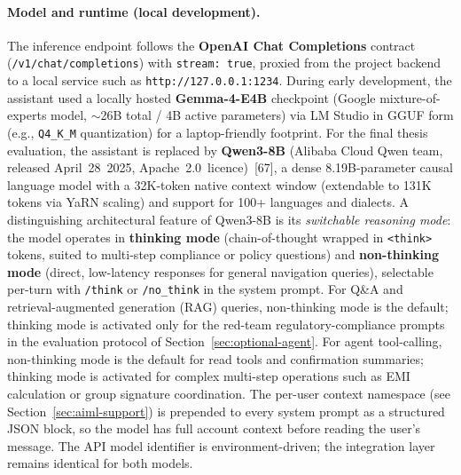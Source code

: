 \documentclass[12pt,a4paper]{report}
\begin{document}
\paragraph{Model and runtime (local development).}
The inference endpoint follows the \textbf{OpenAI Chat Completions} contract (\texttt{/v1/chat/completions}) with \texttt{stream: true}, proxied from the project backend to a local service such as \texttt{http://127.0.0.1:1234}. During early development, the assistant used a locally hosted \textbf{Gemma-4-E4B} checkpoint (Google mixture-of-experts model, $\sim$26B total / 4B active parameters) via LM Studio in GGUF form (e.g., \texttt{Q4\_K\_M} quantization) for a laptop-friendly footprint. For the final thesis evaluation, the assistant is replaced by \textbf{Qwen3-8B} (Alibaba Cloud Qwen team, released April~28~2025, Apache~2.0~licence)~[67], a dense 8.19B-parameter causal language model with a 32K-token native context window (extendable to 131K tokens via YaRN scaling) and support for 100+ languages and dialects. A distinguishing architectural feature of Qwen3-8B is its \emph{switchable reasoning mode}: the model operates in \textbf{thinking mode} (chain-of-thought wrapped in \texttt{<think>} tokens, suited to multi-step compliance or policy questions) and \textbf{non-thinking mode} (direct, low-latency responses for general navigation queries), selectable per-turn with \texttt{/think} or \texttt{/no\_think} in the system prompt. For Q\&A and retrieval-augmented generation (RAG) queries, non-thinking mode is the default; thinking mode is activated only for the red-team regulatory-compliance prompts in the evaluation protocol of Section~\ref{sec:optional-agent}. For agent tool-calling, non-thinking mode is the default for read tools and confirmation summaries; thinking mode is activated for complex multi-step operations such as EMI calculation or group signature coordination. The per-user context namespace (see Section~\ref{sec:aiml-support}) is prepended to every system prompt as a structured JSON block, so the model has full account context before reading the user's message. The API model identifier is environment-driven; the integration layer remains identical for both models.
\end{document}
